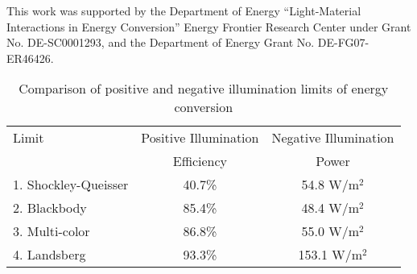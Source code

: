 \documentclass[notitlepage,onecolumn,aps,showpacs,preprintnumbers,amsmath,amssymb,superscriptaddress]{revtex4-1}
\begin{document}
This work was supported by the Department of Energy ``Light-Material Interactions in Energy Conversion” Energy
Frontier Research Center under Grant No. \uppercase{DE-SC}0001293, and the Department of Energy Grant No. DE-FG07-ER46426.

\begin{table}%
\centering
\caption{Comparison of positive and negative illumination limits of energy conversion}
\begin{tabular}{lcc}
Limit & Positive Illumination & Negative Illumination \\ & Efficiency & Power\\
1. Shockley-Queisser & 40.7\% & 54.8 $\mathrm{W/m^2}$ \\
2. Blackbody & 85.4\% & 48.4 $\mathrm{W/m^2}$ \\
3. Multi-color & 86.8\% & 55.0 $\mathrm{W/m^2}$  \\
4. Landsberg & 93.3\% & 153.1 $\mathrm{W/m^2}$ \\
\end{tabular}
\end{table}
\end{document}
